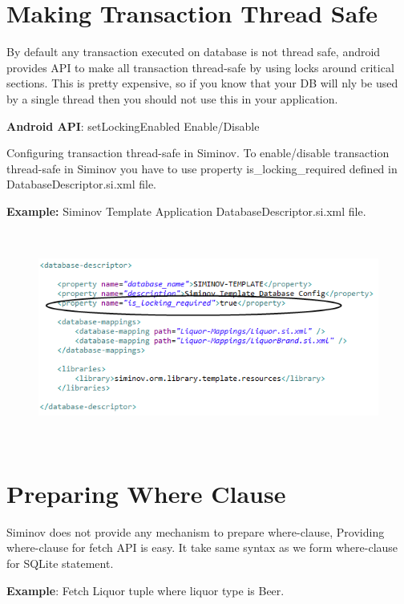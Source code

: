 \section{Making Transaction Thread Safe}
By default any transaction executed on database is not thread safe, android provides API to make all transaction thread-safe by using locks around critical sections. This is pretty expensive, so if you know that your DB will nly be used by a single thread then you should not use this in your application.

	\par
	\textbf{Android API}: setLockingEnabled Enable/Disable
		

Configuring transaction thread-safe in Siminov. To enable/disable transaction thread-safe in Siminov you have to use property is\_locking\_required defined in DatabaseDescriptor.si.xml file.

		\par
		\textbf{Example:} Siminov Template Application DatabaseDescriptor.si.xml file.
		\begin{figure}[htbp]
			\centering
				\includegraphics[height=7cm]{Resources/siminov_hybrid_template_application_is_locking_enable_example.png}
		\end{figure}


\section{Preparing Where Clause}
Siminov does not provide any mechanism to prepare where-clause, Providing where-clause for fetch API is easy. It take same syntax as we form where-clause for SQLite statement.

\textbf{Example}: Fetch Liquor tuple where liquor type is Beer.
	
	


